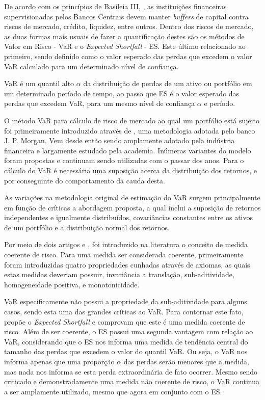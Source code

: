 \documentclass[review]{elsarticle}
\theoremstyle{definition}
\begin{document}
De acordo com os princípios de Basileia III, \cite{BankingSupervision2011, BankingSupervision2013, BankingSupervision2014}, as instituições financeiras supervisionadas pelos Bancos Centrais devem manter \emph{buffers} de capital contra riscos de mercado, crédito, liquidez, entre outros. Dentro dos riscos de mercado, as duas formas mais usuais de fazer a quantificação destes são os métodos de Valor em Risco - VaR e o \emph{Expected Shortfall} - ES. Este último relacionado ao primeiro, sendo definido como o valor esperado das perdas que excedem o valor VaR calculado para um determinado nível de confiança.

VaR é um quantil alto $\alpha$ da distribuição de perdas de um ativo ou portfólio em um determinado período de tempo, ao passo que ES é o valor esperado das perdas que excedem VaR, para um mesmo nível de confiança $\alpha$ e período.

O método VaR para cálculo de risco de mercado ao qual um portfólio está sujeito foi primeiramente introduzido através de \cite{RiskMetrics1995}, uma metodologia adotada pelo banco J. P. Morgan. Vem desde então sendo amplamente adotado pela indústria financeira e largamente estudado pela academia. Inúmeras variantes do modelo foram propostas e continuam sendo utilizadas com o passar dos anos. Para o cálculo do VaR é necessária uma suposição acerca da distribuição dos retornos, e por conseguinte do comportamento da cauda desta.

As variações na metodologia original de estimação do VaR surgem principalmente em função de críticas a abordagem proposta, a qual inclui a suposição de retornos independentes e igualmente distribuídos, covariâncias constantes entre os ativos de um portfólio e a distribuição normal dos retornos.

Por meio de dois artigos \cite{Artzner1997} e \cite{Artzner1999}, foi introduzido na literatura o conceito de medida coerente de risco. Para uma medida ser considerada coerente, primeiramente foram introduzidas quatro propriedades cunhadas através de axiomas, as quais estas medidas deveriam possuir, invariância a translação,	sub-aditividade, homogeneidade positiva, e monotonicidade.

VaR especificamente não possui a propriedade da sub-aditividade para alguns casos, sendo esta uma das grandes críticas ao VaR. Para contornar este fato, \cite{Acerbi2002} propõe o \emph{Expected Shortfall} e comprovam que este é uma medida coerente de risco. Além de ser coerente, o ES possui uma segunda vantagem com relação ao VaR, considerando que o ES nos informa uma medida de tendência central do tamanho das perdas que excedem o valor do quantil VaR. Ou seja, o VaR nos informa apenas que uma proporção $\alpha$ das perdas serão menores que a medida, mas nada nos informa se esta perda extraordinária de fato ocorrer. Mesmo sendo criticado e demonstradamente uma medida não coerente de risco, o VaR continua a ser amplamente utilizado, mesmo que agora em conjunto com o ES. 
\end{document}
